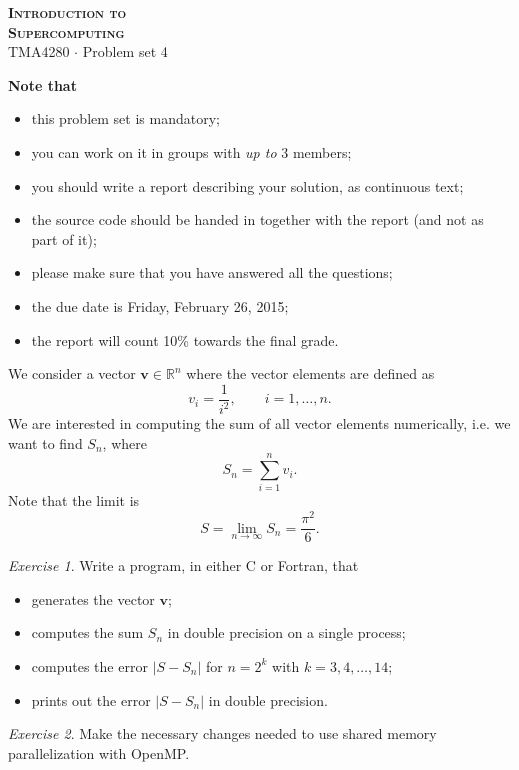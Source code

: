 \documentclass[onecolumn, oneside, a4paper, 11pt]{memoir}
\theoremstyle{remark}
\newtheorem{ex}{Exercise}
\begin{document}
\pagestyle{empty}

\begin{center}
  {\Huge \bfseries \scshape
    Introduction to \\[0.2\baselineskip] Supercomputing} \\[2\baselineskip]
  {\Large TMA4280 $\cdot$ Problem set 4} \\[2\baselineskip]
\end{center}

\textbf{Note that}
\begin{itemize}
\item this problem set is mandatory;
\item you can work on it in groups with \emph{up to} 3 members;
\item you should write a report describing your solution, as continuous text;
\item the source code should be handed in together with the report (and not as
  part of it);
\item please make sure that you have answered all the questions;
\item the due date is Friday, February 26, 2015;
\item the report will count 10\% towards the final grade.
\end{itemize}

We consider a vector $\bm v \in \mathbb{R}^n$ where the vector elements are
defined as
\[
  v_i = \frac{1}{i^2}, \qquad i=1,\ldots,n.
\]
We are interested in computing the sum of all vector elements numerically, i.e.
we want to find $S_n$, where
\[
  S_n = \sum_{i=1}^n v_i.
\]
Note that the limit is
\[
  S = \lim_{n\to\infty} S_n = \frac{\pi^2}{6}.
\]

\begin{ex}
  Write a program, in either C or Fortran, that
  \begin{itemize}
  \item generates the vector $\bm v$;
  \item computes the sum $S_n$ in double precision on a single process;
  \item computes the error $|S - S_n|$ for $n=2^k$ with $k=3,4,\ldots,14$;
  \item prints out the error $|S - S_n|$ in double precision.
  \end{itemize}
\end{ex}

\begin{ex}
  Make the necessary changes needed to use shared memory parallelization with
  OpenMP.
\end{ex}
\end{document}
